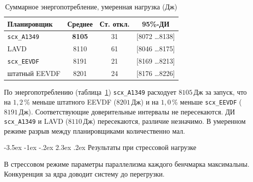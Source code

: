 \documentclass[14pt, oneside]{extbook}
\makeatletter
\renewcommand\section{\@startsection {section}{1}{\z@}%
                                   {-3.5ex \@plus -1ex \@minus -.2ex}%
                                   {2.3ex \@plus.2ex}%
                                   {\normalfont\fontsize{16}{20}\selectfont\bfseries}}
\makeatother
\begin{document}
        \begin{table}[H]
                \centering
                \caption{Суммарное энергопотребление, умеренная нагрузка (Дж)}
                \label{tab:moderate_energy}
                \vspace{0.4em}
                \begin{tabular}{|l|c|c|c|}
                        \hline
                        Планировщик & Среднее & Ст. откл. & 95\%-ДИ \\
                        \hline
                        \texttt{scx\_A1349} & \textbf{8105} & 31 & [8072 \dots 8138] \\
                        LAVD & 8110 & 61 & [8046 \dots 8175] \\
                        \texttt{scx\_EEVDF} & 8191 & 21 & [8169 \dots 8213] \\
                        штатный EEVDF & 8201 & 24 & [8176 \dots 8226] \\
                        \hline
                \end{tabular}
        \end{table}

        По энергопотреблению (таблица~\ref{tab:moderate_energy})
        \texttt{scx\_A1349} расходует $8105$\,Дж за запуск, что
        на $1{,}2$\,\% меньше штатного EEVDF ($8201$\,Дж) и на
        $1{,}0$\,\% меньше \texttt{scx\_EEVDF} ($8191$\,Дж).
        Соответствующие доверительные интервалы не пересекаются.
        ДИ \texttt{scx\_A1349} и LAVD ($8110$\,Дж) пересекаются,
        различие незначимо. В умеренном режиме разрыв между
        планировщиками количественно мал.


\section{Результаты при стрессовой нагрузке}

        В стрессовом режиме параметры параллелизма каждого
        бенчмарка максимальны. Конкуренция за ядра доводит
        систему до перегрузки.
\end{document}

